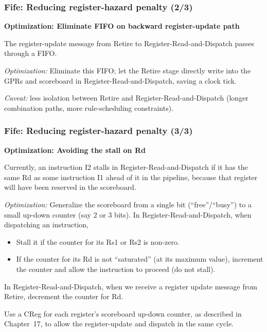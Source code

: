 
\begin{frame}[fragile]
\frametitle{Fife: Reducing register-hazard penalty (2/3)}

\footnotesize

{\bf Optimization: Eliminate FIFO on backward register-update path}

\vx

The register-update message from Retire to Register-Read-and-Dispatch passes through a FIFO.

\vxx

\emph{Optimization:} Eliminate this FIFO; let the Retire stage
directly write into the GPRs and scoreboard in
Register-Read-and-Dispatch, saving a clock tick.

\vx

{\emph{Caveat:}} less isolation between Retire and
Register-Read-and-Dispatch (longer combination paths, more
rule-scheduling constraints).

\end{frame}


\begin{frame}[fragile]
\frametitle{Fife: Reducing register-hazard penalty (3/3)}

\footnotesize

{\bf Optimization: Avoiding the stall on Rd}

\vx

Currently, an instruction I2 stalls in Register-Read-and-Dispatch if
it has the same Rd as some instruction I1 ahead of it in the pipeline,
because that register will have been reserved in the scoreboard.

\vxx

{\emph{Optimization:}} Generalize the scoreboard from a single bit
(``free''/``busy'') to a small up-down counter (say 2 or 3 bits).  In
Register-Read-and-Dispatch, when dispatching an instruction,

\begin{itemize}

  \item Stall it if the counter for its Rs1 or Rs2 is non-zero.

  \item If the counter for its Rd is not ``saturated'' (at its maximum
      value), increment the counter and allow the instruction to
      proceed (do not stall).

\end{itemize}

In Register-Read-and-Dispatch, when we receive a register update
message from Retire, decrement the counter for Rd.

\vx

Use a CReg for each register's scoreboard up-down counter, as
described in Chapter~17, to allow the register-update and dispatch in
the same cycle.

\end{frame}

